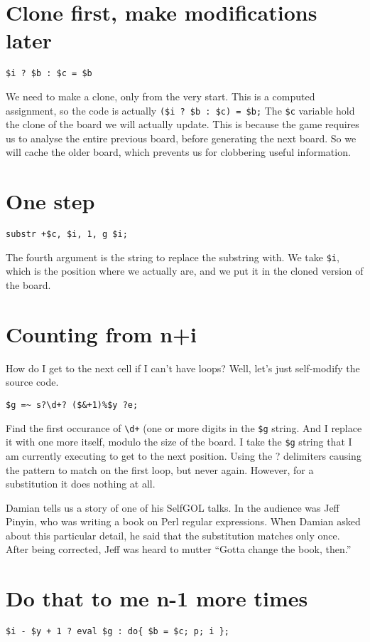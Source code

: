 \documentclass{article}
\begin{document}
\section{Clone first, make modifications later}
\begin{verbatim}
$i ? $b : $c = $b
\end{verbatim}
We need to make a clone, only from the very start.  This is a computed
assignment, so the code is actually \verb"($i ? $b : $c) = $b;"  The
\verb"$c" variable hold the clone of the board we will actually update.
This is because the game requires us to analyse the entire previous
board, before generating the next board.  So we will cache the older
board, which prevents us for clobbering useful information.

\section{One step}
\begin{verbatim}
substr +$c, $i, 1, g $i;
\end{verbatim}
The fourth argument is the string to replace the substring with.  We
take \verb"$i", which is the position where we actually are, and we put it in
the cloned version of the board.

\section{Counting from n+i}
How do I get to the next cell if I can't have loops?  Well, let's just
self-modify the source code.

\begin{verbatim}
$g =~ s?\d+? ($&+1)%$y ?e;
\end{verbatim}
Find the first occurance of \verb"\d+" (one or more digits in the
\verb"$g" string.
And I replace it with one more itself, modulo the size of the board.  I
take the \verb"$g" string that I am currently executing to get to the next
position.  Using the ? delimiters causing the pattern to match on the
first loop, but never again.  However, for a substitution it does
nothing at all.

Damian tells us a story of one of his SelfGOL talks.  In the audience
was Jeff Pinyin, who was writing a book on Perl regular expressions.
When Damian asked about this particular detail, he said that the substitution
matches only once.  After being corrected, Jeff was heard to
mutter ``Gotta change the book, then.''

\section{Do that to me n-1 more times}
\begin{verbatim}
$i - $y + 1 ? eval $g : do{ $b = $c; p; i };
\end{verbatim}
\end{document}
